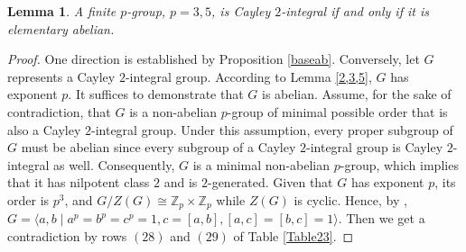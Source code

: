 \documentclass{amsart}
\newtheorem{lem}[thm]{Lemma}
\begin{document}
\begin{lem}\label{elab}
A finite $p$-group, $p=3,5$,  is Cayley $2$-integral if and only if it is elementary abelian.
\end{lem}
\begin{proof}
One direction is established by Proposition \ref{baseab}. Conversely, let \( G \) represents a Cayley \( 2 \)-integral group. According to Lemma \ref{2,3,5}, \( G \) has exponent \( p \). It suffices to demonstrate that \( G \) is abelian. Assume, for the sake of contradiction, that \( G \) is a non-abelian \( p \)-group of minimal possible order that is also a Cayley \( 2 \)-integral group. Under this assumption, every proper subgroup of \( G \) must be abelian since every subgroup of a Cayley \( 2 \)-integral group is Cayley \( 2 \)-integral as well. Consequently, \( G \) is a minimal non-abelian \( p \)-group, which implies that it has nilpotent class \( 2 \) and is \( 2 \)-generated. Given that \( G \) has exponent \( p \), its order is \( p^3 \), and \( G/Z(G) \cong \mathbb{Z}_p \times \mathbb{Z}_p \) while \( Z(G) \) is cyclic. Hence, by \cite[, Exercise 8.a]{Berkovich1}, 
$G=\langle a,b\mid a^p=b^p=c^p=1,c=[a,b], [a,c]=[b,c]=1\rangle$. Then we get a contradiction by rows $(28)$ and $(29)$ of Table \ref{Table23}.
\end{proof}
\end{document}
